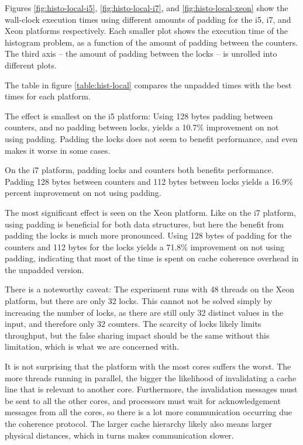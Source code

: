Figures \ref{fig:histo-local-i5}, \ref{fig:histo-local-i7}, and
\ref{fig:histo-local-xeon} show the wall-clock execution times using different
amounts of padding for the i5, i7, and Xeon platforms respectively. Each smaller
plot shows the execution time of the histogram problem, as a function of the
amount of padding between the counters. The third axis -- the amount of padding
between the locks -- is unrolled into different plots.

The table in figure \ref{table:hist-local} compares the unpadded times with the
best times for each platform.

The effect is smallest on the i5 platform: Using 128 bytes padding between
counters, and no padding between locks, yields a 10.7\% improvement on not using
padding. Padding the locks does not seem to benefit performance, and even makes
it worse in some cases.

On the i7 platform, padding locks and counters both benefits performance.
Padding 128 bytes between counters and 112 bytes between locks yields a 16.9\%
percent improvement on not using padding.

The most significant effect is seen on the Xeon platform. Like on the i7
platform, using padding is beneficial for both data structures, but here the
benefit from padding the locks is much more pronounced. Using 128 bytes of
padding for the counters and 112 bytes for the locks yields a 71.8\% improvement
on not using padding, indicating that most of the time is spent on cache
coherence overhead in the unpadded version.

There is a noteworthy caveat: The experiment runs with 48 threads on the Xeon
platform, but there are only 32 locks.
This cannot not be solved simply by increasing the
number of locks, as there are still only 32 distinct values in the input, and
therefore only 32 counters.
The scarcity of locks likely limits
throughput, but the false sharing impact should be the same without
this limitation, which is what we are concerned with.

It is not surprising that the platform with the most cores suffers the worst.
The more threads running in parallel, the bigger the likelihood of invalidating
a cache line that is relevant to another core. Furthermore, the invalidation
messages must be sent to all the other cores, and processors must wait for
acknowledgement messages from all the cores, so there is a lot more
communication occurring due the coherence protocol. The larger cache hierarchy
likely also means larger physical distances, which in turns makes communication
slower.

